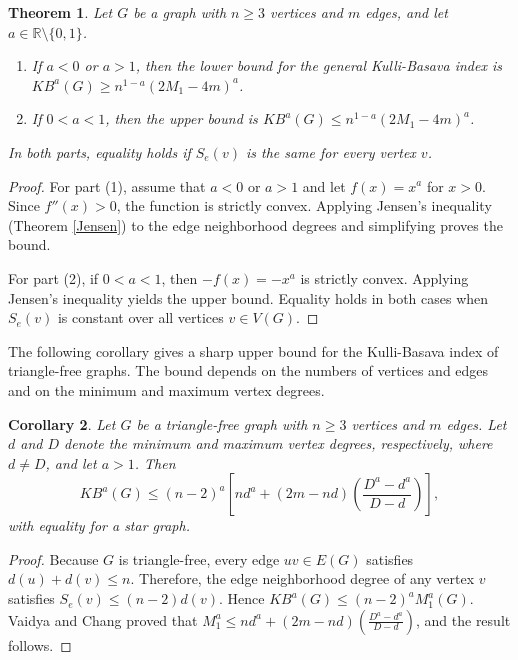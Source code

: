 \documentclass[11pt, oneside]{amsart}   	%
\newtheorem{theorem}{Theorem}[section]
\newtheorem{cor}[theorem]{Corollary}
\theoremstyle{definition}
\theoremstyle{remark}
\numberwithin{equation}{section}
\begin{document}
\begin{theorem}
Let $G$ be a graph with $n\geq 3$ vertices and $m$ edges, and let $a\in\mathbb{R}\setminus\{0,1\}$.

\begin{enumerate}
       
\item If $a < 0$ or $a > 1$, then the lower bound for the general Kulli-Basava index is $KB^a(G) \geq n^{1 - a} (2M_1 - 4m)^a $.

\item If $0<a<1$, then the upper bound  is $KB^a(G)  \leq n^{1 - a}(2M_1 - 4m)^a$.
   

    
\end{enumerate}
In both parts, equality holds if $S_e(v)$ is the same for every vertex $v$.
\end{theorem}
\begin{proof}
For part (1), assume that $a<0$ or $a>1$ and let $f(x)=x^a$ for $x>0$. Since $f''(x)>0$, the function is strictly convex. Applying Jensen's inequality (Theorem \ref{Jensen}) to the edge neighborhood degrees and simplifying proves the bound.

For part (2), if $0<a<1$, then $-f(x)=-x^a$ is strictly convex. Applying Jensen's inequality yields the upper bound. Equality holds in both cases when $S_e(v)$ is constant over all vertices $v\in V(G)$.
\end{proof}

The following corollary gives a sharp upper bound for the Kulli-Basava index of triangle-free graphs. The bound depends on the numbers of vertices and edges and on the minimum and maximum vertex degrees.

\begin{cor}
Let $G$ be a triangle-free graph with $n\geq 3$ vertices and $m$ edges. Let $d$ and $D$ denote the minimum and maximum vertex degrees, respectively, where $d\neq D$, and let $a>1$. Then
\[
KB^a(G)\leq(n-2)^a\left[nd^a+(2m-nd)\left(\frac{D^a-d^a}{D-d}\right)\right],
\]
with equality for a star graph.
\end{cor}

\begin{proof}
Because $G$ is triangle-free, every edge $uv\in E(G)$ satisfies $d(u)+d(v)\leq n$. Therefore, the edge neighborhood degree of any vertex $v$ satisfies $S_e(v)\leq(n-2)d(v)$. Hence $KB^a(G)\leq(n-2)^aM_1^a(G)$. Vaidya and Chang \cite{vaidya2024sharp} proved that $M_1^a\leq nd^a+(2m-nd)\left(\frac{D^a-d^a}{D-d}\right)$, and the result follows.
\end{proof}
\end{document}

